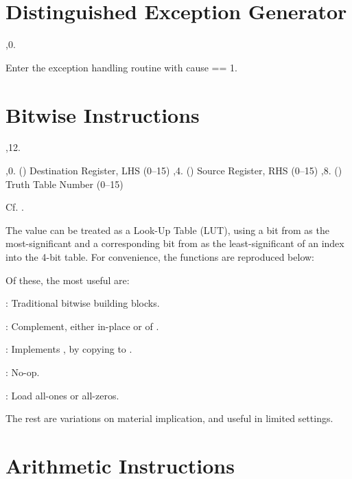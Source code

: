 \vfil \break

\section{Distinguished Exception Generator}

\noindent\ins{},0. 

Enter the exception handling routine with cause == 1.

\section{Bitwise Instructions}

\noindent\ins{},12. 

\li \ins{},0. () Destination Register, LHS (0--15)
\li \ins{},4. () Source Register, RHS (0--15)
\li \ins{},8. () Truth Table Number (0--15)

Cf.  .

The value  can be treated as a Look-Up Table (LUT), using a bit from
 as the most-significant and a corresponding bit from  as the
least-significant of an index into the 4-bit table. For convenience, the
functions are reproduced below:

\bigskip
{
	\tabskip=3pt
}
\bigskip

Of these, the most useful are:

: Traditional bitwise building blocks.

: Complement, either in-place or of .

: Implements , by copying  to .

: No-op.

: Load all-ones or all-zeros.

The rest are variations on material implication, and useful in limited
settings.

\section{Arithmetic Instructions}

